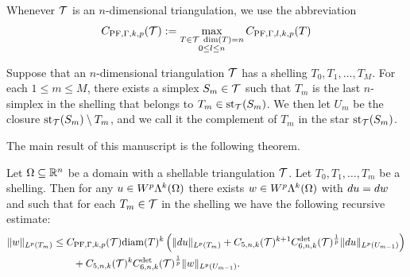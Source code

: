 \documentclass[10pt,letterpaper]{article}
\begin{document}
Whenever ${\mathcal T}$ is an $n$-dimensional triangulation, we use the abbreviation
\begin{align*}
    C_{{\rm PF},\Gamma,k,p}({\mathcal T}) 
    :=
    \max\limits_{ \substack{ T \in {\mathcal T} \; \dim(T)=n \\ 0 \leq l \leq n } }
    C_{{\rm PF},\Gamma,l,k,p}(T)   
\end{align*}




Suppose that an $n$-dimensional triangulation ${\mathcal T}$ has a shelling $T_{0}, T_{1}, \dots, T_{M}$. 
For each $1 \leq m \leq M$, there exists a simplex $S_{m} \in {\mathcal T}$ 
such that $T_{m}$ is the last $n$-simplex in the shelling that belongs to $T_{m} \in \operatorname{st}_{{\mathcal T}}(S_{m})$.
We then let $U_{m}$ be the closure $\operatorname{st}_{{\mathcal T}}(S_{m}) \setminus T_{m}$,
and we call it the complement of $T_{m}$ in the star $\operatorname{st}_{{\mathcal T}}(S_{m})$. 



The main result of this manuscript is the following theorem. 

\begin{theorem}\label{theorem:poincarefriedrichsestimate:exterior}
    Let $\Omega \subseteq {\mathbb R}^{n}$ be a domain with a shellable triangulation ${\mathcal T}$.
    Let $T_0, T_1, \dots, T_m$ be a shelling.
    Then for any $u \in W^{p}\Lambda^{k}(\Omega)$ 
    there exists $w \in W^{p}\Lambda^{k}(\Omega)$ with $d u = d w$ 
    and such that for each $T_{m} \in {\mathcal T}$ in the shelling
    we have the following recursive estimate: 
    \begin{align*}
        \| w \|_{L^{p}(T_{m})}
        &
        \leq  
        C_{{\rm PF},\Gamma,k,p}({\mathcal T}) 
        {\operatorname{diam}}(T)^{k} 
        \left( 
            \| d u      \|_{L^{p}(T_{m})} 
            +
            C_{5,n,k}({\mathcal T})^{k+1} 
            C^{\det}_{6,n,k}({\mathcal T})^{\frac 1 p} 
            \| d u \|_{L^{p}(U_{m-1})}
        \right)
        \\&\qquad
        + 
        C_{5,n,k}({\mathcal T})^{k} 
        C^{\det}_{6,n,k}({\mathcal T})^{\frac 1 p} 
        \| w \|_{L^{p}(U_{m-1})}
        .
    \end{align*}
\end{theorem}
\end{document}
